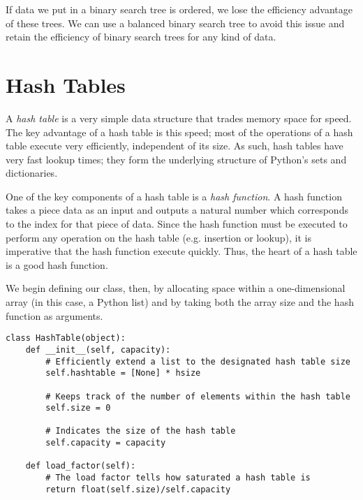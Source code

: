If data we put in a binary search tree is ordered, we lose the efficiency advantage of these trees.
We can use a balanced binary search tree to avoid this issue and retain the efficiency of binary search trees for any kind of data.

\section*{Hash Tables}
A \emph{hash table} is a very simple data structure that trades memory space for speed.
The key advantage of a hash table is this speed; most of the operations of a hash table execute very efficiently, independent of its size.
As such, hash tables have very fast lookup times; they form the underlying structure of Python's sets and dictionaries.

One of the key components of a hash table is a \emph{hash function}.
A hash function takes a piece data as an input and outputs a natural number which corresponds to the index for that piece of data.
Since the hash function must be executed to perform any operation on the hash table (e.g. insertion or lookup), it is imperative that the hash function execute quickly.
Thus, the heart of a hash table is a good hash function.

We begin defining our  class, then, by allocating space within a one-dimensional array (in this case, a Python list) and by taking both the array size and the hash function as arguments.
\begin{lstlisting}
class HashTable(object):
    def __init__(self, capacity):
        # Efficiently extend a list to the designated hash table size
        self.hashtable = [None] * hsize
        
        # Keeps track of the number of elements within the hash table
        self.size = 0
        
        # Indicates the size of the hash table
        self.capacity = capacity
        
    def load_factor(self):
        # The load factor tells how saturated a hash table is
        return float(self.size)/self.capacity
\end{lstlisting}


